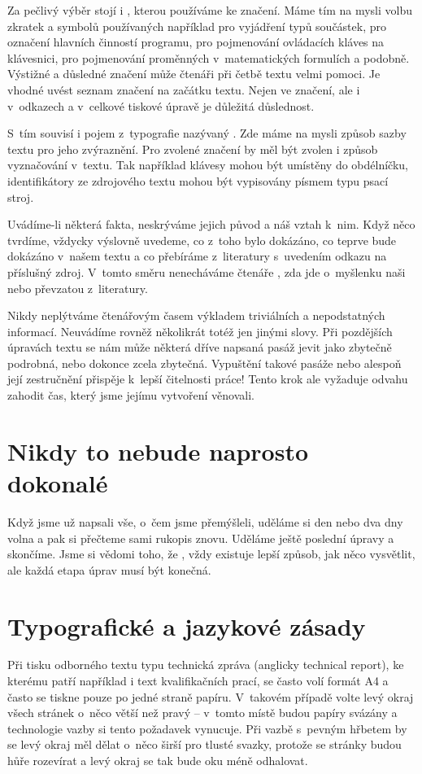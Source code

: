 \documentclass{template/socthesis}
\begin{document}
Za pečlivý výběr stojí i , kterou používáme ke značení.
Máme tím na mysli volbu zkratek a symbolů používaných například pro vyjádření typů součástek, pro označení hlavních činností programu, pro pojmenování ovládacích kláves na klávesnici, pro pojmenování proměnných v~matematických formulích a podobně.
Výstižné a důsledné značení může čtenáři při četbě textu velmi pomoci.
Je vhodné uvést seznam značení na začátku textu.
Nejen ve značení, ale i v~odkazech a v~celkové tiskové úpravě je důležitá důslednost.

S~tím souvisí i pojem z~typografie nazývaný .
Zde máme na mysli způsob sazby textu pro jeho zvýraznění.
Pro zvolené značení by měl být zvolen i způsob vyznačování v~textu.
Tak například klávesy mohou být umístěny do obdélníčku, identifikátory ze zdrojového textu mohou být vypisovány písmem typu psací stroj.

Uvádíme-li některá fakta, neskrýváme jejich původ a náš vztah k~nim.
Když něco tvrdíme, vždycky výslovně uvedeme, co z~toho bylo dokázáno, co teprve bude dokázáno v~našem textu a co přebíráme z~literatury s~uvedením odkazu na příslušný zdroj.
V~tomto směru nenecháváme čtenáře , zda jde o~myšlenku naši nebo převzatou z~literatury.

Nikdy neplýtváme čtenářovým časem výkladem triviálních a nepodstatných informací.
Neuvádíme rovněž několikrát totéž jen jinými slovy.
Při pozdějších úpravách textu se nám může některá dříve napsaná pasáž jevit jako zbytečně podrobná, nebo dokonce zcela zbytečná.
Vypuštění takové pasáže nebo alespoň její zestručnění přispěje k~lepší čitelnosti práce! Tento krok ale vyžaduje odvahu zahodit čas, který jsme jejímu vytvoření věnovali.

\chapter{Nikdy to nebude naprosto dokonalé}
Když jsme už napsali vše, o~čem jsme přemýšleli, uděláme si den nebo dva dny volna a pak si přečteme sami rukopis znovu.
Uděláme ještě poslední úpravy a skončíme.
Jsme si vědomi toho, že , vždy existuje lepší způsob, jak něco vysvětlit, ale každá etapa úprav musí být konečná.

\chapter{Typografické a jazykové zásady}
Při tisku odborného textu typu technická zpráva (anglicky technical report), ke kterému patří například i text kvalifikačních prací, se často volí formát A4 a často se tiskne pouze po jedné straně papíru.
V~takovém případě volte levý okraj všech stránek o~něco větší než pravý – v~tomto místě budou papíry svázány a technologie vazby si tento požadavek vynucuje.
Při vazbě s~pevným hřbetem by se levý okraj měl dělat o~něco širší pro tlusté svazky, protože se stránky budou hůře rozevírat a levý okraj se tak bude oku méně odhalovat.
\end{document}
